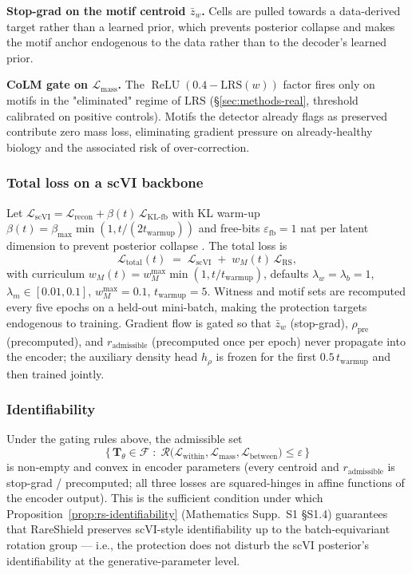 \textbf{Stop-grad on the motif centroid $\bar z_w$.} Cells are pulled towards a data-derived target rather than a learned prior, which prevents posterior collapse and makes the motif anchor endogenous to the data rather than to the decoder's learned prior.

\textbf{CoLM gate on $\mathcal{L}_\text{mass}$.} The $\operatorname{ReLU}(0.4 - \mathrm{LRS}(w))$ factor fires only on motifs in the "eliminated" regime of $\mathrm{LRS}$ (\S\ref{sec:methods-real}, threshold calibrated on positive controls). Motifs the detector already flags as preserved contribute zero mass loss, eliminating gradient pressure on already-healthy biology and the associated risk of over-correction.

\subsubsection*{Total loss on a scVI backbone}

Let $\mathcal{L}_\text{scVI} = \mathcal{L}_\text{recon} + \beta(t)\,\mathcal{L}_\text{KL-fb}$ with KL warm-up $\beta(t)=\beta_\text{max}\min(1, t/(2 t_\text{warmup}))$ and free-bits $\varepsilon_\text{fb}=1$ nat per latent dimension to prevent posterior collapse \citep{kingma2016improved}. The total loss is
\[
\mathcal{L}_\text{total}(t) \;=\; \mathcal{L}_\text{scVI} \;+\; w_M(t)\,\mathcal{L}_\text{RS},
\]
with curriculum $w_M(t) = w_M^\text{max}\min(1, t/t_\text{warmup})$, defaults $\lambda_w{=}\lambda_b{=}1$, $\lambda_m{\in}[0.01,0.1]$, $w_M^\text{max}{=}0.1$, $t_\text{warmup}{=}5$. Witness and motif sets are recomputed every five epochs on a held-out mini-batch, making the protection targets endogenous to training. Gradient flow is gated so that $\bar z_w$ (stop-grad), $\rho_\text{pre}$ (precomputed), and $r_\text{admissible}$ (precomputed once per epoch) never propagate into the encoder; the auxiliary density head $h_\rho$ is frozen for the first $0.5\,t_\text{warmup}$ and then trained jointly.

\subsubsection*{Identifiability}

Under the gating rules above, the admissible set
\[
\bigl\{\,\mathbf{T}_\theta\in\mathcal{F}\;:\;\mathcal{R}\bigl(\mathcal{L}_\text{within},\mathcal{L}_\text{mass},\mathcal{L}_\text{between}\bigr)\le\varepsilon\,\bigr\}
\]
is non-empty and convex in encoder parameters (every centroid and $r_\text{admissible}$ is stop-grad / precomputed; all three losses are squared-hinges in affine functions of the encoder output). This is the sufficient condition under which Proposition~\ref{prop:rs-identifiability} (Mathematics Supp.~S1 \S S1.4) guarantees that RareShield preserves scVI-style identifiability up to the batch-equivariant rotation group --- i.e., the protection does not disturb the scVI posterior's identifiability at the generative-parameter level.

